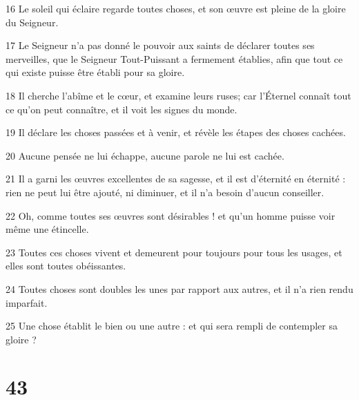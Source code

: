 \par 16 Le soleil qui éclaire regarde toutes choses, et son œuvre est pleine de la gloire du Seigneur.
\par 17 Le Seigneur n'a pas donné le pouvoir aux saints de déclarer toutes ses merveilles, que le Seigneur Tout-Puissant a fermement établies, afin que tout ce qui existe puisse être établi pour sa gloire.
\par 18 Il cherche l'abîme et le cœur, et examine leurs ruses; car l'Éternel connaît tout ce qu'on peut connaître, et il voit les signes du monde.
\par 19 Il déclare les choses passées et à venir, et révèle les étapes des choses cachées.
\par 20 Aucune pensée ne lui échappe, aucune parole ne lui est cachée.
\par 21 Il a garni les œuvres excellentes de sa sagesse, et il est d'éternité en éternité : rien ne peut lui être ajouté, ni diminuer, et il n'a besoin d'aucun conseiller.
\par 22 Oh, comme toutes ses œuvres sont désirables ! et qu'un homme puisse voir même une étincelle.
\par 23 Toutes ces choses vivent et demeurent pour toujours pour tous les usages, et elles sont toutes obéissantes.
\par 24 Toutes choses sont doubles les unes par rapport aux autres, et il n'a rien rendu imparfait.
\par 25 Une chose établit le bien ou une autre : et qui sera rempli de contempler sa gloire ?

\chapter{43}

